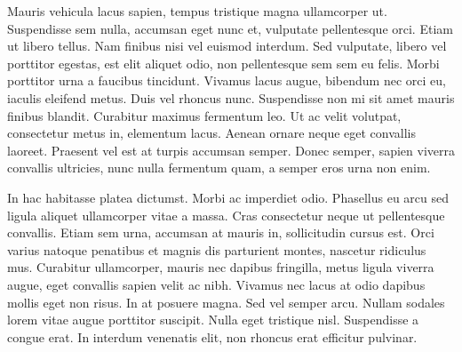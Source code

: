 \documentclass{article}
\begin{document}
Mauris vehicula lacus sapien, tempus tristique magna ullamcorper ut. Suspendisse sem nulla, accumsan eget nunc et, vulputate pellentesque orci. Etiam ut libero tellus. Nam finibus nisi vel euismod interdum. Sed vulputate, libero vel porttitor egestas, est elit aliquet odio, non pellentesque sem sem eu felis. Morbi porttitor urna a faucibus tincidunt. Vivamus lacus augue, bibendum nec orci eu, iaculis eleifend metus. Duis vel rhoncus nunc. Suspendisse non mi sit amet mauris finibus blandit. Curabitur maximus fermentum leo. Ut ac velit volutpat, consectetur metus in, elementum lacus. Aenean ornare neque eget convallis laoreet. Praesent vel est at turpis accumsan semper. Donec semper, sapien viverra convallis ultricies, nunc nulla fermentum quam, a semper eros urna non enim.

In hac habitasse platea dictumst. 
Morbi ac imperdiet odio. 
Phasellus eu arcu sed ligula aliquet ullamcorper vitae a massa. Cras consectetur neque ut pellentesque convallis. Etiam sem urna, accumsan at mauris in, sollicitudin cursus est.
Orci varius natoque penatibus et magnis dis parturient montes, nascetur ridiculus mus. Curabitur ullamcorper, mauris nec dapibus fringilla, metus ligula viverra augue, eget convallis sapien velit ac nibh. Vivamus nec lacus at odio dapibus mollis eget non risus. In at posuere magna. Sed vel semper arcu. Nullam sodales lorem vitae augue porttitor suscipit. Nulla eget tristique nisl. Suspendisse a congue erat. In interdum venenatis elit, non rhoncus erat efficitur pulvinar.
\end{document}
